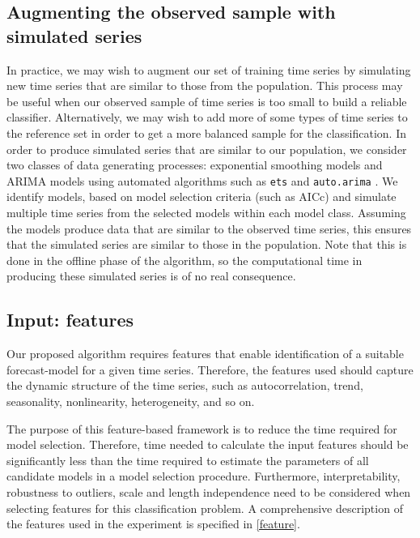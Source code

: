 \documentclass[11pt,a4paper,]{article}
\theoremstyle{definition}
\theoremstyle{definition}
\theoremstyle{definition}
\theoremstyle{remark}
\begin{document}
\subsection{Augmenting the observed sample with simulated
series}\label{augmenting-the-observed-sample-with-simulated-series}

In practice, we may wish to augment our set of training time series by
simulating new time series that are similar to those from the
population. This process may be useful when our observed sample of time
series is too small to build a reliable classifier. Alternatively, we
may wish to add more of some types of time series to the reference set
in order to get a more balanced sample for the classification. In order
to produce simulated series that are similar to our population, we
consider two classes of data generating processes: exponential smoothing
models and ARIMA models using automated algorithms such as \texttt{ets}
and \texttt{auto.arima} \autocite{forecast}. We identify models, based
on model selection criteria (such as AICc) and simulate multiple time
series from the selected models within each model class. Assuming the
models produce data that are similar to the observed time series, this
ensures that the simulated series are similar to those in the
population. Note that this is done in the offline phase of the
algorithm, so the computational time in producing these simulated series
is of no real consequence.

\subsection{Input: features}\label{input-features}

Our proposed algorithm requires features that enable identification of a
suitable forecast-model for a given time series. Therefore, the features
used should capture the dynamic structure of the time series, such as
autocorrelation, trend, seasonality, nonlinearity, heterogeneity, and so
on.

The purpose of this feature-based framework is to reduce the time
required for model selection. Therefore, time needed to calculate the
input features should be significantly less than the time required to
estimate the parameters of all candidate models in a model selection
procedure. Furthermore, interpretability, robustness to outliers, scale
and length independence need to be considered when selecting features
for this classification problem. A comprehensive description of the
features used in the experiment is specified in \autoref{feature}.
\end{document}
